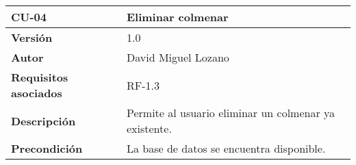 \begin{longtable}[H]{@{}ll@{}}
\toprule
\begin{minipage}[b]{0.29\columnwidth}\raggedright\strut
\textbf{CU-04}\strut
\end{minipage} & \begin{minipage}[b]{0.65\columnwidth}\raggedright\strut
\textbf{Eliminar colmenar}\strut
\end{minipage}\tabularnewline
\midrule
\endhead
\begin{minipage}[t]{0.29\columnwidth}\raggedright\strut
\textbf{Versión}\strut
\end{minipage} & \begin{minipage}[t]{0.65\columnwidth}\raggedright\strut
1.0\strut
\end{minipage}\tabularnewline
\begin{minipage}[t]{0.29\columnwidth}\raggedright\strut
\textbf{Autor}\strut
\end{minipage} & \begin{minipage}[t]{0.65\columnwidth}\raggedright\strut
David Miguel Lozano\strut
\end{minipage}\tabularnewline
\begin{minipage}[t]{0.29\columnwidth}\raggedright\strut
\textbf{Requisitos asociados}\strut
\end{minipage} & \begin{minipage}[t]{0.65\columnwidth}\raggedright\strut
RF-1.3\strut
\end{minipage}\tabularnewline
\begin{minipage}[t]{0.29\columnwidth}\raggedright\strut
\textbf{Descripción}\strut
\end{minipage} & \begin{minipage}[t]{0.65\columnwidth}\raggedright\strut
Permite al usuario eliminar un colmenar ya existente.\strut
\end{minipage}\tabularnewline
\begin{minipage}[t]{0.29\columnwidth}\raggedright\strut
\textbf{Precondición}\strut
\end{minipage} & \begin{minipage}[t]{0.65\columnwidth}\raggedright\strut
La base de datos se encuentra disponible.


\end{minipage}
\end{longtable}
